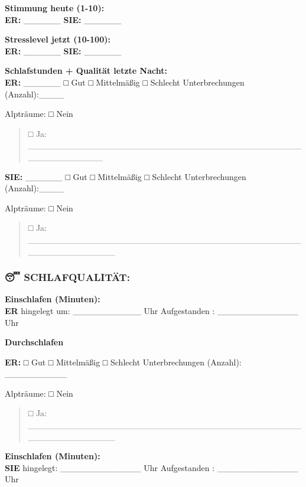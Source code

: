 \textbf{Stimmung heute (1-10):}\\
\textbf{ER:} \_\_\_\_\_\_ \textbf{SIE:} \_\_\_\_\_\_

\textbf{Stresslevel jetzt (10-100):}\\
\textbf{ER:} \_\_\_\_\_\_ \textbf{SIE:} \_\_\_\_\_\_

\textbf{Schlafstunden + Qualität letzte Nacht:}\\
\textbf{ER:} \_\_\_\_\_\_ □ Gut □ Mittelmäßig □ Schlecht Unterbrechungen (Anzahl):\_\_\_\_

Alpträume: □ Nein

\begin{quote}
□ Ja: \_\_\_\_\_\_\_\_\_\_\_\_\_\_\_\_\_\_\_\_\_\_\_\_\_\_\_\_\_\_\_\_\_\_\_\_\_\_\_\_\_\_\_\_\_\_\_\_\_\_\_\_\_\_\_\_
\end{quote}

\textbf{SIE:} \_\_\_\_\_\_ □ Gut □ Mittelmäßig □ Schlecht Unterbrechungen (Anzahl):\_\_\_\_

Alpträume: □ Nein

\begin{quote}
□ Ja: \_\_\_\_\_\_\_\_\_\_\_\_\_\_\_\_\_\_\_\_\_\_\_\_\_\_\_\_\_\_\_\_\_\_\_\_\_\_\_\_\_\_\_\_\_\_\_\_\_\_\_\_\_\_\_\_\_\_
\end{quote}

\hypertarget{schlafqualituxe4t}{%
\subsubsection{\texorpdfstring{\textbf{😴 SCHLAFQUALITÄT:}}{😴 SCHLAFQUALITÄT:}}\label{schlafqualituxe4t}}

\textbf{Einschlafen (Minuten):}\\
\textbf{ER} hingelegt um: \_\_\_\_\_\_\_\_\_\_\_ Uhr Aufgestanden : \_\_\_\_\_\_\_\_\_\_\_\_\_ Uhr

\textbf{Durchschlafen}

\textbf{ER:} □ Gut □ Mittelmäßig □ Schlecht Unterbrechungen (Anzahl): \_\_\_\_\_\_\_\_\_\_

Alpträume: □ Nein

\begin{quote}
□ Ja: \_\_\_\_\_\_\_\_\_\_\_\_\_\_\_\_\_\_\_\_\_\_\_\_\_\_\_\_\_\_\_\_\_\_\_\_\_\_\_\_\_\_\_\_\_\_\_\_\_\_\_\_\_\_\_\_\_\_
\end{quote}

\textbf{Einschlafen (Minuten):}\\
\textbf{SIE} hingelegt: \_\_\_\_\_\_\_\_\_\_\_\_\_ Uhr Aufgestanden : \_\_\_\_\_\_\_\_\_\_\_\_\_ Uhr

